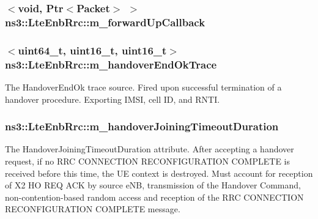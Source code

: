 \subsubsection[{\texorpdfstring{m\+\_\+forward\+Up\+Callback}{m_forwardUpCallback}}]{$<$void, {\bf Ptr}$<${\bf Packet}$>$ $>$ ns3\+::\+Lte\+Enb\+Rrc\+::m\+\_\+forward\+Up\+Callback\hspace{0.3cm}{\ttfamily [private]}}\hypertarget{classns3_1_1LteEnbRrc_a238ba239786f43929e61cc0781b7ecd4}{}\label{classns3_1_1LteEnbRrc_a238ba239786f43929e61cc0781b7ecd4}
\subsubsection[{\texorpdfstring{m\+\_\+handover\+End\+Ok\+Trace}{m_handoverEndOkTrace}}]{$<$uint64\+\_\+t, uint16\+\_\+t, uint16\+\_\+t$>$ ns3\+::\+Lte\+Enb\+Rrc\+::m\+\_\+handover\+End\+Ok\+Trace\hspace{0.3cm}{\ttfamily [private]}}\hypertarget{classns3_1_1LteEnbRrc_afbb60c6381e72a45c833d2940fb64bdc}{}\label{classns3_1_1LteEnbRrc_afbb60c6381e72a45c833d2940fb64bdc}
The {\ttfamily Handover\+End\+Ok} trace source. Fired upon successful termination of a handover procedure. Exporting I\+M\+SI, cell ID, and R\+N\+TI. 
\subsubsection[{\texorpdfstring{m\+\_\+handover\+Joining\+Timeout\+Duration}{m_handoverJoiningTimeoutDuration}}]{ ns3\+::\+Lte\+Enb\+Rrc\+::m\+\_\+handover\+Joining\+Timeout\+Duration\hspace{0.3cm}{\ttfamily [private]}}\hypertarget{classns3_1_1LteEnbRrc_af6b40249d64556c103459131c70ee474}{}\label{classns3_1_1LteEnbRrc_af6b40249d64556c103459131c70ee474}
The {\ttfamily Handover\+Joining\+Timeout\+Duration} attribute. After accepting a handover request, if no R\+RC C\+O\+N\+N\+E\+C\+T\+I\+ON R\+E\+C\+O\+N\+F\+I\+G\+U\+R\+A\+T\+I\+ON C\+O\+M\+P\+L\+E\+TE is received before this time, the UE context is destroyed. Must account for reception of X2 HO R\+EQ A\+CK by source e\+NB, transmission of the Handover Command, non-\/contention-\/based random access and reception of the R\+RC C\+O\+N\+N\+E\+C\+T\+I\+ON R\+E\+C\+O\+N\+F\+I\+G\+U\+R\+A\+T\+I\+ON C\+O\+M\+P\+L\+E\+TE message. 
